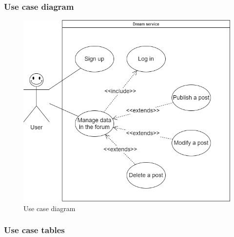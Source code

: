 \subsubsection*{Use case diagram}
\begin{figure}[h!]
        \centering
        \includegraphics[scale=0.40]{images/use_cases_diagram/user_use_case.png}
        \caption{Use case diagram}
        \label{fig:user_use_case}
    \end{figure}
    
    \newpage
    
\subsubsection*{Use case tables}

